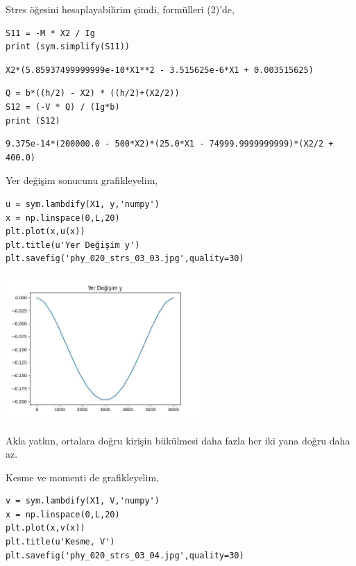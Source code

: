 \documentclass[12pt,fleqn]{article}\usepackage{../../common}
\begin{document}
Stres öğesini hesaplayabilirim şimdi, formülleri (2)'de,

\begin{verbatim}
S11 = -M * X2 / Ig
print (sym.simplify(S11))
\end{verbatim}

\begin{verbatim}
X2*(5.85937499999999e-10*X1**2 - 3.515625e-6*X1 + 0.003515625)
\end{verbatim}

\begin{verbatim}
Q = b*((h/2) - X2) * ((h/2)+(X2/2))
S12 = (-V * Q) / (Ig*b)
print (S12)
\end{verbatim}

\begin{verbatim}
9.375e-14*(200000.0 - 500*X2)*(25.0*X1 - 74999.9999999999)*(X2/2 + 400.0)
\end{verbatim}

Yer değişim sonucunu grafikleyelim,

\begin{verbatim}
u = sym.lambdify(X1, y,'numpy')
x = np.linspace(0,L,20)
plt.plot(x,u(x))
plt.title(u'Yer Değişim y')
plt.savefig('phy_020_strs_03_03.jpg',quality=30)
\end{verbatim}

\includegraphics[width=20em]{phy_020_strs_03_03.jpg}

Akla yatkın, ortalara doğru kirişin bükülmesi daha fazla her iki yana doğru daha
az.

Kesme ve momenti de grafikleyelim,

\begin{verbatim}
v = sym.lambdify(X1, V,'numpy')
x = np.linspace(0,L,20)
plt.plot(x,v(x))
plt.title(u'Kesme, V')
plt.savefig('phy_020_strs_03_04.jpg',quality=30)
\end{verbatim}
\end{document}
